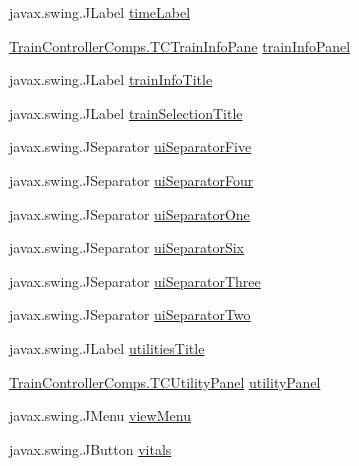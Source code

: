 \begin{DoxyCompactItemize}
\item 
javax.\+swing.\+J\+Label \hyperlink{classTrainControllerComps_1_1TrainController_adf581e57a02616cd70dfbaa38a63c20e}{time\+Label}
\item 
\hyperlink{classTrainControllerComps_1_1TCTrainInfoPane}{Train\+Controller\+Comps.\+T\+C\+Train\+Info\+Pane} \hyperlink{classTrainControllerComps_1_1TrainController_ae9cc947751b66851084e5ede30ff22d8}{train\+Info\+Panel}
\item 
javax.\+swing.\+J\+Label \hyperlink{classTrainControllerComps_1_1TrainController_a6dee037fa32d66bd5b590102937016ab}{train\+Info\+Title}
\item 
javax.\+swing.\+J\+Label \hyperlink{classTrainControllerComps_1_1TrainController_a70537a86a7aa37c08c621568a214615a}{train\+Selection\+Title}
\item 
javax.\+swing.\+J\+Separator \hyperlink{classTrainControllerComps_1_1TrainController_a764bcddd4c30d6c1357e1133864beb89}{ui\+Separator\+Five}
\item 
javax.\+swing.\+J\+Separator \hyperlink{classTrainControllerComps_1_1TrainController_a259aa3f53d298ba6fcbf61375f7e54e7}{ui\+Separator\+Four}
\item 
javax.\+swing.\+J\+Separator \hyperlink{classTrainControllerComps_1_1TrainController_a858f28af9f58ecfef2383add004068b5}{ui\+Separator\+One}
\item 
javax.\+swing.\+J\+Separator \hyperlink{classTrainControllerComps_1_1TrainController_aaed17d0f6827ff397a5d205c06c85137}{ui\+Separator\+Six}
\item 
javax.\+swing.\+J\+Separator \hyperlink{classTrainControllerComps_1_1TrainController_a63432f91457691ddad36b02cab64196e}{ui\+Separator\+Three}
\item 
javax.\+swing.\+J\+Separator \hyperlink{classTrainControllerComps_1_1TrainController_afaac48e9023208af418495c6ac29ed32}{ui\+Separator\+Two}
\item 
javax.\+swing.\+J\+Label \hyperlink{classTrainControllerComps_1_1TrainController_a2b659931e2555997c14d305e30ad7a92}{utilities\+Title}
\item 
\hyperlink{classTrainControllerComps_1_1TCUtilityPanel}{Train\+Controller\+Comps.\+T\+C\+Utility\+Panel} \hyperlink{classTrainControllerComps_1_1TrainController_a1e6aebc470b0df4ea01c7c8e6e1b32ed}{utility\+Panel}
\item 
javax.\+swing.\+J\+Menu \hyperlink{classTrainControllerComps_1_1TrainController_a000862107a0aac18f4131f2a7b82cfa7}{view\+Menu}
\item 
javax.\+swing.\+J\+Button \hyperlink{classTrainControllerComps_1_1TrainController_a9d5c5a4685b545a56ffba23c5d2c04e2}{vitals}
\end{DoxyCompactItemize}


